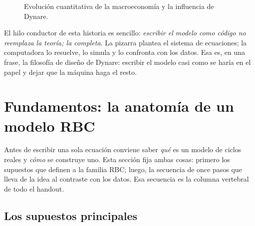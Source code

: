 \documentclass[11pt,a4paper]{report}
\newcounter{tcbrem}[section]
\renewcommand{\thetcbrem}{\thesection.\arabic{tcbrem}}
\newenvironment{remark}{%
  \refstepcounter{tcbrem}%
  \begin{tcolorbox}[remarkstyle, title={Observación~\thetcbrem}]}%
{\end{tcolorbox}}
\begin{document}
\begin{figure}[H]
\centering
{}
\caption{Evolución cuantitativa de la macroeconomía y la influencia de Dynare.}
\label{fig:timeline}
\end{figure}

\begin{remark}
El hilo conductor de esta historia es sencillo: \emph{escribir el modelo como
código no reemplaza la teoría; la completa}. La pizarra plantea el sistema de
ecuaciones; la computadora lo resuelve, lo simula y lo confronta con los datos.
Esa es, en una frase, la filosofía de diseño de Dynare: escribir el modelo casi
como se haría en el papel y dejar que la máquina haga el resto.
\end{remark}

\section{Fundamentos: la anatomía de un modelo RBC}
\label{sec:fundamentos}

Antes de escribir una sola ecuación conviene saber \emph{qué} es un modelo de ciclos
reales y \emph{cómo} se construye uno. Esta sección fija ambas cosas: primero los
supuestos que definen a la familia RBC; luego, la secuencia de once pasos que lleva de
la idea al contraste con los datos. Esa secuencia es la columna vertebral de todo el
handout.

\subsection{Los supuestos principales}
\label{sec:supuestos}
\end{document}
